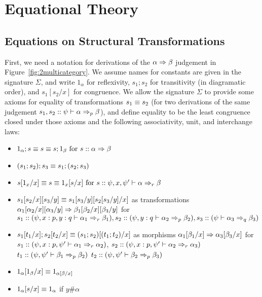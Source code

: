 \section{Equational Theory}
\label{sec:equational}

\subsection{Equations on Structural Transformations}
\label{sec:equational-transformations}

First, we need a notation for derivations of the $\alpha \spr \beta$
judgement in Figure~\ref{fig:2multicategory}.  We assume names for
constants are given in the signature $\Sigma$, and write $1_\alpha$ for
reflexivity, $s_1;s_2$ for transitivity (in diagramatic order), and
$s_1[s_2/x]$ for congruence.  We allow the signature $\Sigma$ to provide
some axioms for equality of transformations $s_1 \deq s_2$ (for two
derivations of the same judgement $s_1,s_2 ::
\wfsp{\psi}{\alpha}{\beta}{p}$), and define equality to be the least
congruence closed under those axioms and the following associativity,
unit, and interchange laws:

\begin{itemize}
\item $1_\alpha;s \deq s \deq s;1_\beta \text{ for } s :: \alpha \spr \beta$
\item $(s_1;s_2);s_3 \deq s_1;(s_2;s_3)$
\item $s[1_x/x] \deq s \deq 1_x[s/x] \text{ for } s :: \wfsp{\psi,x,\psi'}{\alpha}{\beta}{r}$
\item $\subst{\subst{s_1}{s_2}{x}}{s_3}{y} \deq
\subst{\subst{s_1}{s_3}{y}}{\subst{s_2}{s_3}{y}}{x}$ as transformations
${\subst{\subst{\alpha_1}{\alpha_2}{x}}{\alpha_3}{y}} \spr
{\subst{\subst{\beta_1}{\beta_2}{x}}{\beta_3}{y}}$ for $s_1 :: (\wfsp{\psi,x:p,y:q}{\alpha_1}{\beta_1}{r}), 
 s_2 :: (\wfsp{\psi,y:q}{\alpha_2}{\beta_2}{p}), 
 s_3 :: (\wfsp{\psi}{\alpha_3}{\beta_3}{q})$ 
\item $s_1[t_1/x];s_2[t_2/x] \deq (s_1;s_2)[(t_1;t_2)/x]$
as morphisms $\alpha_1[\beta_1/x] \spr \alpha_3[\beta_3/x]$
for $s_1 :: (\wfsp{\psi,x:p,\psi'}{\alpha_1}{\alpha_2}{r})$,
 $s_2 :: (\wfsp{\psi,x:p,\psi'}{\alpha_2}{\alpha_3}{r})$
 $t_1 :: (\wfsp{\psi,\psi'}{\beta_1}{\beta_2}{p})$
 $t_2 :: (\wfsp{\psi,\psi'}{\beta_2}{\beta_3}{p})$
\item $\subst{1_\alpha}{1_\beta}{x} \deq 1_{\subst{\alpha}{\beta}{x}}$
\item $1_\alpha[s/x] \deq 1_\alpha$ if $y \# \alpha$
\end{itemize}

